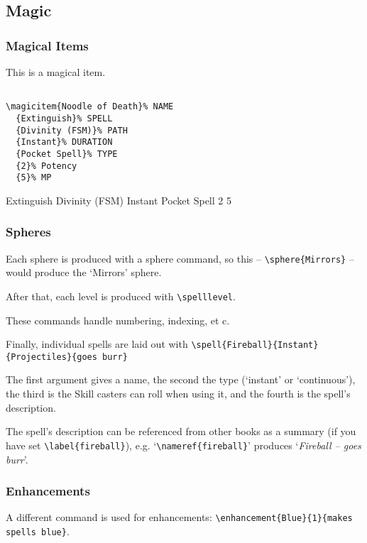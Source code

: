 \documentclass[a4paper,openany]{book}
\begin{document}
\begin{multicols}{2}
\begin{boxtext}
\end{boxtext}

\subsection{Magic}

\subsubsection{Magical Items}

This is a magical item.

\begin{verbatim}

\magicitem{Noodle of Death}% NAME
  {Extinguish}% SPELL
  {Divinity (FSM)}% PATH
  {Instant}% DURATION
  {Pocket Spell}% TYPE
  {2}% Potency
  {5}% MP

\end{verbatim}

  {Extinguish}%
  {Divinity (FSM)}%
  {Instant}%
  {Pocket Spell}%
  {2}%
  {5}%

\subsubsection{Spheres}

Each sphere is produced with a sphere command, so this -- \verb"\sphere{Mirrors}" -- would produce the `Mirrors' sphere.

After that, each level is produced with \verb"\spelllevel".

These commands handle numbering, indexing, et c.

Finally, individual spells are laid out with \verb"\spell{Fireball}{Instant}{Projectiles}{goes burr}"

The first argument gives a name, the second the type (`instant' or `continuous'), the third is the Skill casters can roll when using it, and the fourth is the spell's description.

The spell's description can be referenced from other books as a summary (if you have set \verb"\label{fireball}"), e.g. `\verb"\nameref{fireball}"' produces `\textit{Fireball -- goes burr}'.

\subsubsection{Enhancements}
A different command is used for enhancements: \verb"\enhancement{Blue}{1}{makes spells blue}".


\end{multicols}
\end{document}
